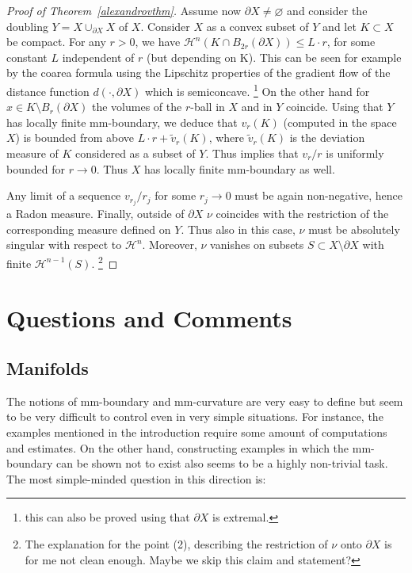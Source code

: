 \documentclass[12pt,leqno,intlimits]{amsart}
\numberwithin{equation}{section}
\theoremstyle{definition}
\theoremstyle{remark}
\newcommand{\vol}{\mathrm{vol}}
\def\emptyset{\varnothing}
\begin{document}
\begin{proof}[Proof of Theorem~\ref{alexandrovthm}]

Assume now $\partial X\ne\emptyset$ and consider the doubling $Y=X\cup _{\partial X} X$ of $X$. Consider $X$ as a convex subset of $Y$ and let $K\subset X$ be compact. For any $r>0$, we have  $\mathcal H^n (K\cap B_{2r} (\partial X)) \leq L \cdot r$, for some constant $L$ independent of $r$ (but depending on K). {\color{red} This can be seen for example by the coarea formula using the Lipschitz properties of the gradient flow of the distance function $d(\cdot, \partial X)$ which is semiconcave. \footnote {this can also  be proved using that $\partial X$ is extremal.}}  On the other hand for $x\in K\setminus B_r (\partial X)$ the volumes of the $r$-ball in $X$ and in $Y$ coincide.  Using that $Y$ has locally finite mm-boundary, we deduce that $v_r(K)$  (computed in the space $X$) is bounded from above  $L\cdot r + \tilde v_r (K)$, where $\tilde v_r (K)$ is the deviation measure of $K$ considered as a subset of $Y$.  Thus implies that $v_r /r$ is uniformly bounded for $r\to 0$.    Thus $X$ has locally finite mm-boundary as well.

Any limit of a sequence $v_{r_j} /r_j$ for some $r_j\to 0$ must be  again non-negative, hence a Radon measure.  Finally, outside of $\partial X$
   $\nu$ coincides  with the restriction of the corresponding measure defined on $Y$. Thus also in this case, $\nu$ must be absolutely singular with respect to $\mathcal H^n$. Moreover, $\nu$ vanishes on subsets $S\subset X\setminus \partial X$ with finite $\mathcal H^{n-1}  (S)$.  \footnote{The explanation for the point (2), describing the restriction of $\nu$ onto $\partial X$ is for me not clean enough.  Maybe we skip this claim and statement?}
\end{proof}














\section{Questions and Comments} \label{sec:final}
\subsection{Manifolds}
The notions of mm-boundary and mm-curvature are very easy to define but seem to be very difficult to control even in very simple situations.
For instance, the examples mentioned in the introduction require some amount of computations and estimates.  On the other hand, constructing examples in which the mm-boundary can be shown not to exist also seems to be a highly non-trivial task.  The most simple-minded question in this direction is:
\end{document}
